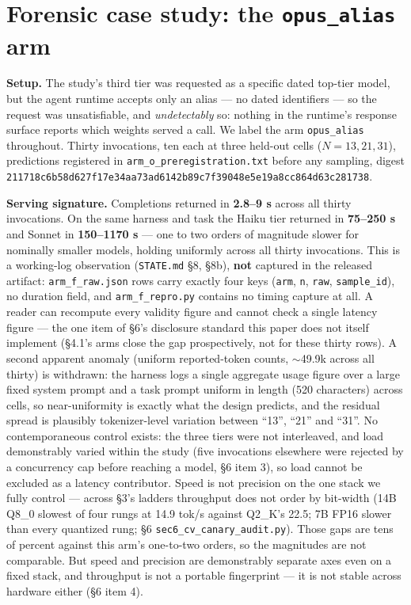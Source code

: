 \section{Forensic case study: the \texttt{opus\_alias} arm}

\textbf{Setup.} The study's third tier was requested as a specific dated top-tier model, but the agent runtime accepts only an alias --- no dated identifiers --- so the request was unsatisfiable, and \emph{undetectably} so: nothing in the runtime's response surface reports which weights served a call. We label the arm \texttt{opus\_alias} throughout. Thirty invocations, ten each at three held-out cells ($N = 13, 21, 31$), predictions registered in \texttt{arm\_o\_preregistration.txt} before any sampling, digest \texttt{211718c6\bk b58d627f\bk 17e34aa7\bk 3ad6142b\bk 89c7f390\bk 48e5e19a\bk 8cc864d6\bk 3c281738}.

\textbf{Serving signature.} Completions returned in \textbf{2.8--9 s} across all thirty invocations. On the same harness and task the Haiku tier returned in \textbf{75--250 s} and Sonnet in \textbf{150--1170 s} --- one to two orders of magnitude slower for nominally smaller models, holding uniformly across all thirty invocations. This is a working-log observation (\texttt{STATE.md} \S8, \S8b), \textbf{not} captured in the released artifact: \texttt{arm\_f\_raw.json} rows carry exactly four keys (\texttt{arm}, \texttt{n}, \texttt{raw}, \texttt{sample\_id}), no duration field, and \texttt{arm\_f\_repro.py} contains no timing capture at all. A reader can recompute every validity figure and cannot check a single latency figure --- the one item of \S6's disclosure standard this paper does not itself implement (\S4.1's arms close the gap prospectively, not for these thirty rows). A second apparent anomaly (uniform reported-token counts, $\sim$49.9k across all thirty) is withdrawn: the harness logs a single aggregate usage figure over a large fixed system prompt and a task prompt uniform in length (520 characters) across cells, so near-uniformity is exactly what the design predicts, and the residual spread is plausibly tokenizer-level variation between ``13'', ``21'' and ``31''. No contemporaneous control exists: the three tiers were not interleaved, and load demonstrably varied within the study (five invocations elsewhere were rejected by a concurrency cap before reaching a model, \S6 item 3), so load cannot be excluded as a latency contributor. Speed is not precision on the one stack we fully control --- across \S3's ladders throughput does not order by bit-width (14B Q8\_0 slowest of four rungs at 14.9 tok/s against Q2\_K's 22.5; 7B FP16 slower than every quantized rung; \S6 \texttt{sec6\_cv\_canary\_audit.py}). Those gaps are tens of percent against this arm's one-to-two orders, so the magnitudes are not comparable. But speed and precision are demonstrably separate axes even on a fixed stack, and throughput is not a portable fingerprint --- it is not stable across hardware either (\S6 item 4).

